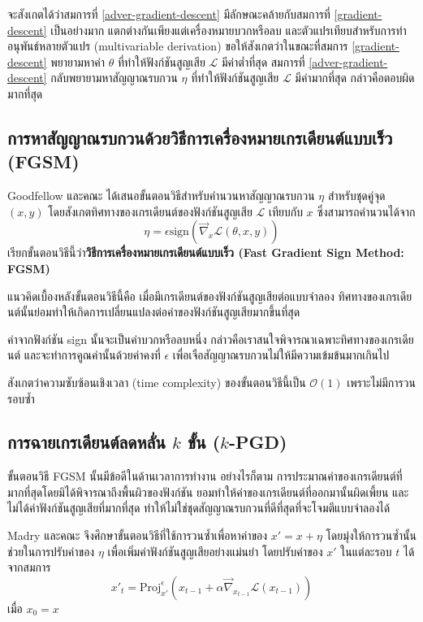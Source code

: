 \documentclass{cpereport}
\begin{document}
จะสังเกตได้ว่าสมการที่ \ref{adver-gradient-descent} มีลักษณะคล้ายกับสมการที่ \ref{gradient-descent} เป็นอย่างมาก แตกต่างกันเพียงแต่เครื่องหมายบวกหรือลบ และตัวแปรเทียบสำหรับการทำอนุพันธ์หลายตัวแปร (multivariable derivation) ขอให้สังเกตว่าในขณะที่สมการ \ref{gradient-descent} พยายามหาค่า $\theta$ ที่ทำให้ฟังก์ชันสูญเสีย $\mathscr{L}$ มีค่าต่ำที่สุด สมการที่ \ref{adver-gradient-descent} กลับพยายามหาสัญญาณรบกวน $\eta$ ที่ทำให้ฟังก์ชันสูญเสีย $\mathscr{L}$ มีค่ามากที่สุด กล่าวคือตอบผิดมากที่สุด

\subsection{การหาสัญญาณรบกวนด้วยวิธีการเครื่องหมายเกรเดียนต์แบบเร็ว (FGSM)}

Goodfellow และคณะ \cite{1412.6572} ได้เสนอขั้นตอนวิธีสำหรับคำนวนหาสัญญาณรบกวน $\eta$ สำหรับชุดคู่จุด $(x, y)$ โดยสังเกตทิศทางของเกรเดียนต์ของฟังก์ชันสูญเสีย $\mathscr{L}$ เทียบกับ $x$ ซึ่งสามารถคำนวนได้จาก
\begin{equation}
    \eta = \epsilon \mathrm{sign} \left(\vec{\nabla}_x \mathscr{L}\left(\theta, x, y \right) \right)
\end{equation}
เรียกขั้นตอนวิธีนี้ว่า\textbf{วิธีการเครื่องหมายเกรเดียนต์แบบเร็ว (Fast Gradient Sign Method: FGSM)}

แนวคิดเบื้องหลังขั้นตอนวิธีนี้คือ เมื่อมีเกรเดียนต์ของฟังก์ชันสูญเสียต่อแบบจำลอง ทิศทางของเกรเดียนต์นั้นย่อมทำให้เกิดการเปลี่ยนแปลงต่อค่าของฟังก์ชันสูญเสียมากขึ้นที่สุด 

ค่าจากฟังก์ชัน sign นั้นจะเป็นค่าบวกหรือลบหนึ่ง กล่าวคือเราสนใจพิจารณาเฉพาะทิศทางของเกรเดียนต์ และจะทำการคูณค่านั้นด้วยค่าคงที่ $\epsilon$ เพื่อเจือสัญญาณรบกวนไม่ให้มีความเข้มข้นมากเกินไป

สังเกตว่าความซับซ้อนเชิงเวลา (time complexity) ของขั้นตอนวิธีนี้เป็น $\mathcal{O}(1)$ เพราะไม่มีการวนรอบซ้ำ

\subsection{การฉายเกรเดียนต์ลดหลั่น $k$ ขั้น ($k$-PGD)}

ขั้นตอนวิธี FGSM นั้นมีข้อดีในด้านเวลาการทำงาน อย่างไรก็ตาม การประมาณค่าของเกรเดียนต์ที่มากที่สุดโดยมิได้พิจารณาถึงพื้นผิวของฟังก์ชัน ยอมทำให้ค่าของเกรเดียนต์ที่ออกมานั้นผิดเพี้ยน และไม่ได้ค่าฟังก์ชันสูญเสียที่มากที่สุด ทำให้ไม่ใช่ชุดสัญญาณรบกวนที่ดีที่สุดที่จะโจมตีแบบจำลองได้

Madry และคณะ \cite{aleks2017deep} จึงศึกษาขั้นตอนวิธีที่ใช้การวนซ้ำเพื่อหาค่าของ $x' = x + \eta$ โดยมุ่งให้การวนซ้ำนั้นช่วยในการปรับค่าของ $\eta$ เพื่อเพิ่มค่าฟังก์ชันสูญเสียอย่างแม่นยำ โดยปรับค่าของ $x'$ ในแต่ละรอบ $t$ ได้จากสมการ
\begin{equation}
    x'_t = \text{Proj}_{x'}^\epsilon(x_{t-1} +\alpha \vec{\nabla}_{x_{t-1}}\mathscr{L}(x_{t-1}))
\end{equation}
เมื่อ $x_0 = x$
\end{document}
